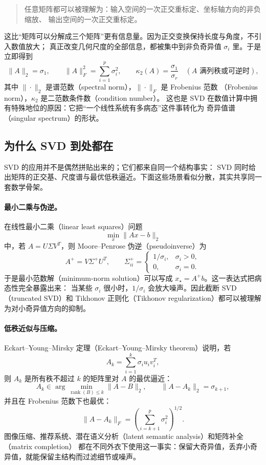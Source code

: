\begin{quote}
    任意矩阵都可以被理解为：输入空间的一次正交重标定、坐标轴方向的非负缩放、
    输出空间的一次正交重标定。
\end{quote}

这比“矩阵可以分解成三个矩阵”更有信息量。因为正交变换保持长度与角度，不引入数值放大；
真正改变几何尺度的全部信息，都被集中到非负奇异值 $\sigma_i$ 里。于是立即得到
\[
    \|A\|_2 = \sigma_1,\qquad
    \|A\|_F^2 = \sum_{i=1}^{p}\sigma_i^2,\qquad
    \kappa_2(A)=\frac{\sigma_1}{\sigma_r}
    \quad (A\text{ 满列秩或可逆时}),
\]
其中 $\|\cdot\|_2$ 是谱范数（spectral norm），$\|\cdot\|_F$ 是 Frobenius 范数
（Frobenius norm），$\kappa_2$ 是二范数条件数（condition number）。
这也是 SVD 在数值计算中拥有特殊地位的原因：它把“一个线性系统有多病态”这件事转化为
奇异值谱（singular spectrum）的形状。

\subsection{为什么 SVD 到处都在}

SVD 的应用并不是偶然拼贴出来的；它们都来自同一个结构事实：
SVD 同时给出矩阵的正交基、尺度谱与最优低秩逼近。下面这些场景看似分散，其实共享同一套数学骨架。

\paragraph{最小二乘与伪逆。}
在线性最小二乘（linear least squares）问题
\[
    \min_x \|Ax-b\|_2
\]
中，若 $A=U\Sigma V^T$，则 Moore--Penrose 伪逆（pseudoinverse）为
\[
    A^+ = V\Sigma^+U^T,
    \qquad
    \Sigma^+_{ii} =
    \begin{cases}
        1/\sigma_i, & \sigma_i>0, \\
        0,          & \sigma_i=0.
    \end{cases}
\]
于是最小范数解（minimum-norm solution）可以写成 $x_\star=A^+b$。这一表达式把病态性完全暴露出来：
当某些 $\sigma_i$ 很小时，$1/\sigma_i$ 会放大噪声。因此截断 SVD（truncated SVD）和 Tikhonov
正则化（Tikhonov regularization）都可以被理解为对小奇异值方向的抑制。

\paragraph{低秩近似与压缩。}
Eckart--Young--Mirsky 定理（Eckart--Young--Mirsky theorem）说明，若
\[
    A_k=\sum_{i=1}^{k}\sigma_i u_i v_i^T,
\]
则 $A_k$ 是所有秩不超过 $k$ 的矩阵里对 $A$ 的最优逼近：
\[
    A_k
    \in
    \arg\min_{\operatorname{rank}(B)\le k}\|A-B\|_2,
    \qquad
    \|A-A_k\|_2=\sigma_{k+1},
\]
并且在 Frobenius 范数下也最优：
\[
    \|A-A_k\|_F
    =
    \left(\sum_{i=k+1}^{p}\sigma_i^2\right)^{1/2}.
\]
图像压缩、推荐系统、潜在语义分析（latent semantic analysis）和矩阵补全（matrix completion）
都在不同外衣下使用这一事实：保留大奇异值，丢弃小奇异值，就能保留主结构而过滤细节或噪声。

